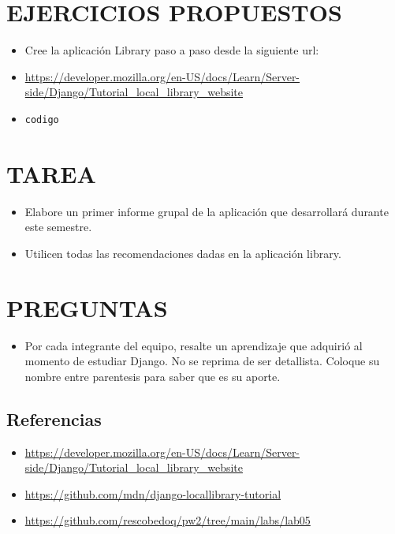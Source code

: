 \documentclass[12]{article}
\begin{document}
	\section{EJERCICIOS PROPUESTOS}
	
	\begin{itemize}
		\item Cree la aplicación Library paso a paso desde la siguiente url:
		\item \url{https://developer.mozilla.org/en-US/docs/Learn/Server-side/Django/Tutorial_local_library_website}
		\item 
		\begin{Verbatim}[xleftmargin=\parindent]
			codigo
		\end{Verbatim}
	\end{itemize}
	
	\section{TAREA}
	
	\begin{itemize}
		\item Elabore un primer informe grupal de la aplicación que desarrollará durante este semestre.
		\item Utilicen todas las recomendaciones dadas en la aplicación library.
	\end{itemize}
	
	\section{PREGUNTAS}
	
	\begin{itemize}
		\item Por cada integrante del equipo, resalte un aprendizaje que adquirió al momento de estudiar Django. No se reprima de ser detallista. Coloque su nombre entre parentesis para saber que es
		su aporte.
	\end{itemize}\newpage
	
	\subsection*{Referencias}
	
	\begin{itemize}
		\item \url{https://developer.mozilla.org/en-US/docs/Learn/Server-side/Django/Tutorial_local_library_website}
		\item \url{https://github.com/mdn/django-locallibrary-tutorial}
		\item \url{https://github.com/rescobedoq/pw2/tree/main/labs/lab05}
	\end{itemize}
	
\end{document}
